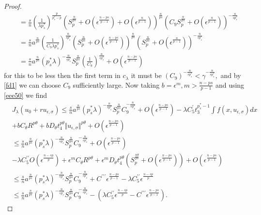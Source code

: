 \documentclass[10pt,twoside,reqno,centertags,draft]{amsart}
\begin{document}
\begin{proof}
\begin{equation*}
\begin{aligned}
&= \frac{s}{n}\left( \frac{1}{\lambda p_s^*}\right)^{\frac{p}{p_s^* -p}}\left(  S_{p}^{\frac{n}{ps}} +O(\epsilon^{ \frac{n -ps}{p -1}}) +O(\epsilon^{\frac{n}{p -1}})\right)^{\frac{n}{ps}}\left(C_{9} S_{p}^{\frac{n}{ps}} +O(\epsilon^{ \frac{n}{p -1}})\right)^{-\frac{n}{sp_s^*}}\\
&= \frac{s}{n} a^{\frac{n}{ps}} \left( \frac{1}{C_{9}  \lambda p_s^*}\right)^{\frac{n}{s p_s^*}} \left( S_{p}^{\frac{n}{ps}} +O(\epsilon^{ \frac{n -ps}{p -1}})\right)^{\frac{n}{ps}}\left(S_{p}^{\frac{n}{ps}} +O(\epsilon^{ \frac{n}{p -1}})\right)^{-\frac{n}{sp_s^*}}\\
&=\frac{s}{n} a^{\frac{n}{ps}} (p_s^* \lambda)^{-\frac{n}{sp_s^*}} S_{p}^{\frac{n}{ps}}\left( \frac{1}{C_9}\right)^{\frac{n}{sp_s^*}} +O(\epsilon^{\frac{n -ps}{p -1}})
\end{aligned}
\end{equation*}
for this to be less then the first term in  $ c_{\lambda}$ it must be $  (C_9)^{-\frac{n}{sp_s^*}} < \gamma^{-\frac{n}{sp_s^*}},$ and by \ref{fd1} we can choose 
$ C_9$ sufficiently large. Now taking $ b =\epsilon^{m}, m > \frac{n -ps}{p -1} $ and using \ref{eee50} we find
\begin{equation*}
\begin{aligned}
& J_{\lambda}(u_0 +ru_{\epsilon,\sigma}) \leq \frac{s}{n} a^{\frac{n}{ps}} (p_s^* \lambda)^{-\frac{n}{sp_s^*}} S_{p}^{\frac{n}{ps}}C_9^{-\frac{n}{sp_s^*}} +O(\epsilon^{\frac{n -ps}{p -1}}) -\lambda C_5^{\prime} t_3^{p_s^* -1}\int f(x, u_{\epsilon,\sigma}) dx \\
&+bC_{\theta}R^{p\theta} +b D_{\theta} t_4^{p\theta}\Vert u_{\epsilon,\sigma}\Vert^{p\theta} +O(\epsilon^{\frac{n -ps}{p -1}})\\
& \leq \frac{s}{n} a^{\frac{n}{ps}} (p_s^* \lambda)^{-\frac{n}{sp_s^*}} S_{p}^{\frac{n}{ps}}C_9^{-\frac{n}{sp_s^*}} +O(\epsilon^{\frac{n -ps}{p -1}})\\
& -\lambda C^{\prime\prime}_{5} O(\epsilon^{\frac{n -sp}{p}}) +\epsilon^{m}C_{\theta}R^{p\theta} +\epsilon^{m} D_{\theta} t_4^{p\theta}(S_{p}^{\frac{n\theta}{ps}} +O(\epsilon^{\frac{n -ps}{p -1}})) +O(\epsilon^{\frac{n -ps}{p -1}})\\
& \leq \frac{s}{n} a^{\frac{n}{ps}} (p_s^* \lambda)^{-\frac{n}{sp_s^*}} S_{p}^{\frac{n}{ps}}C_9^{-\frac{n}{sp_s^*}} +C^{\prime\prime\prime}\epsilon^{\frac{n -ps}{p -1}} -\lambda C^{\prime\prime}_{5}\epsilon^{\frac{n -sp}{p}}\\
& \leq \frac{s}{n} a^{\frac{n}{ps}} (p_s^* \lambda)^{-\frac{n}{sp_s^*}} S_{p}^{\frac{n}{ps}}C_9^{-\frac{n}{sp_s^*}} -\left( \lambda C^{\prime\prime}_{5}\epsilon^{\frac{n -sp}{p}} -C^{\prime\prime\prime}\epsilon^{\frac{n -ps}{p -1}}\right).

\end{aligned}
\end{equation*}
\end{proof}
\end{document}
